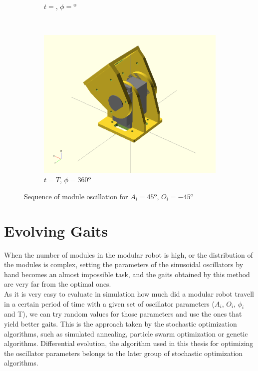 \begin{figure}[h]
\begin{subfigure}[b]{0.18\textwidth}
                \caption{$t = $, $\phi=º$}
                \label{fig:Gait_osc_offset_22_5-3}
        \end{subfigure}
        ~
        \begin{subfigure}[b]{0.18\textwidth}
         	   \centering
                \includegraphics[width=\textwidth]{images/Gait_osc_offset_45.png}
                \caption{$t = T$, $\phi=360º$}
                \label{fig:Gait_osc_offset_45-3}
        \end{subfigure}
        \caption{Sequence of module oscillation for $A_i = 45º$, $O_i = -45º$}\label{fig:oscillator_offset_seq}
\end{figure}

\section{Evolving Gaits}
\label{gaits_evolution}

When the number of modules in the modular robot is high, or the distribution of the modules is complex, setting the parameters of the sinusoidal oscillators by hand becomes an almost impossible task, and the gaits obtained by this method are very far from the optimal ones.\\

As it is very easy to evaluate in simulation how much did a modular robot travell in a certain period of time with a given set of oscillator parameters ($A_i$, $O_i$, $\phi_i$ and T), we can try random values for those parameters and use the ones that yield better gaits. This is the approach taken by the stochastic optimization algorithms, such as simulated annealing, particle swarm optimization or genetic algorithms. Differential evolution, the algorithm used in this thesis for optimizing the oscillator parameters belongs to the later group of stochastic optimization algorithms.\\

